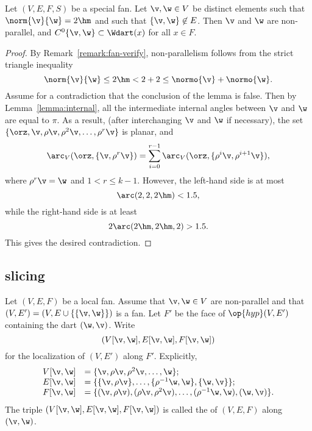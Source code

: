\begin{lemma}[]\label{lemma:2hm-slice}
Let $(V,E,F,S)$ be a special fan.  Let $\v,\w\in V$ be distinct
elements such that $\norm{\v}{\w}=2\hm$ and such that
$\{\v,\w\}\not\in E$.  Then $\v$ and $\w$ are non-parallel, and
$C^0\{\v,\w\}\subset \Wdart(x)$ for all $x\in F$.
\end{lemma}

\begin{proof} By Remark~\ref{remark:fan-verify}, non-parallelism follows
from the strict triangle inequality
\begin{displaymath}
\norm{\v}{\w} \le 2\hm < 2 + 2 \le \normo{\v} + \normo{\w}.
\end{displaymath}
Assume for a contradiction that the conclusion of the lemma is false.
Then by Lemma~\ref{lemma:internal}, all the intermediate internal
angles between $\v$ and $\w$ are equal to $\pi$.  As a result, (after
interchanging $\v$ and $\w$ if necessary), the set
$\{\orz,\v,\rho\v,\rho^2\v,\ldots,\rho^r\v\}$ is planar, and
\begin{displaymath}
  \arc_V(\orz,\{\v,\rho^r\v\}) 
= \sum_{i=0}^{r-1} \arc_V(\orz,\{\rho^i\v,\rho^{i+1}\v\}),
\end{displaymath}
where $\rho^r \v = \w$ and $1 < r \le k-1$.
However, the left-hand side is at most
\begin{displaymath}
\arc(2,2,2\hm) < 1.5,
\end{displaymath}
while the right-hand side is at least
\begin{displaymath}
2\arc(2\hm,2\hm,2) > 1.5.
\end{displaymath}
This gives the desired contradiction.
\end{proof}

\subsection{slicing}

\begin{definition}[slice]
 Let $(V,E,F)$ be a local fan.  Assume that
$\v,\w\in V$ are non-parallel and that $(V,E')=(V,E\cup
\{\{\v,\w\}\})$ is a fan.  Let $F'$ be the face of $\op{hyp}(V,E')$
containing the dart $(\w,\v)$.  Write
\begin{displaymath}(V[\v,\w],E[\v,\w],F[\v,\w])\end{displaymath}
for the localization of $(V,E')$ along $F'$.  Explicitly,
\begin{displaymath}
\begin{array}{lll}
  V[\v,\w] &= \{\v,\rho \v,\rho^2 \v,\ldots,\w\};\\
  E[\v,\w] &= \{\{\v,\rho \v\},\ldots,\{\rho^{-1}\w,\w\},\{\w,\v\}\};\\
  F[\v,\w] &= \{(\v,\rho \v),(\rho \v,\rho^2 \v),
 \ldots,(\rho^{-1}\w,\w),(\w,\v)\}.
\end{array}
\end{displaymath}
The triple $(V[\v,\w],E[\v,\w],F[\v,\w])$ is called the
 of $(V,E,F)$ along $(\v,\w)$.
\end{definition}
%

